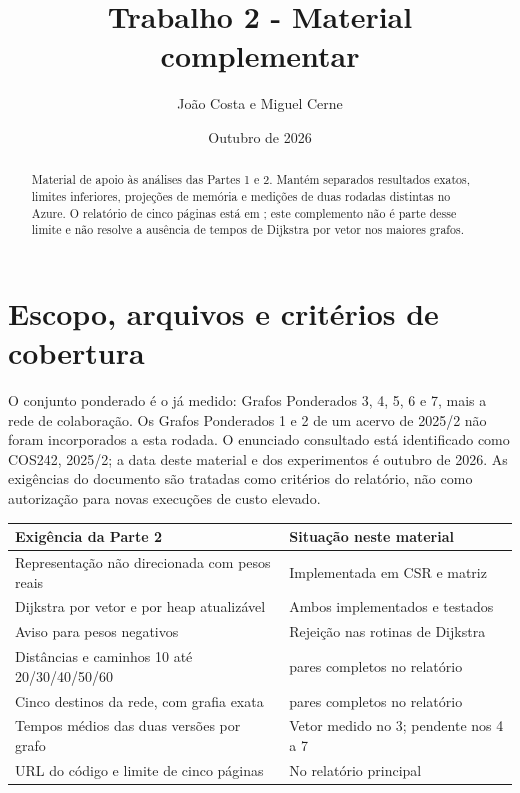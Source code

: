 \documentclass[a4paper,12pt]{article}
\title{Trabalho 2 - Material complementar}
\author{João Costa e Miguel Cerne}
\date{Outubro de 2026}
\begin{document}
\maketitle
\begin{abstract}
Material de apoio às análises das Partes 1 e 2. Mantém separados resultados exatos, limites inferiores, projeções de memória e medições de duas rodadas distintas no Azure. O relatório de cinco páginas está em ; este complemento não é parte desse limite e não resolve a ausência de tempos de Dijkstra por vetor nos maiores grafos.
\end{abstract}
\setcounter{tocdepth}{1}\tableofcontents
\clearpage
\section{Escopo, arquivos e critérios de cobertura}
O conjunto ponderado é o já medido: Grafos Ponderados 3, 4, 5, 6 e 7, mais a rede de colaboração. Os Grafos Ponderados 1 e 2 de um acervo de 2025/2 não foram incorporados a esta rodada. O enunciado consultado está identificado como COS242, 2025/2; a data deste material e dos experimentos é outubro de 2026. As exigências do documento são tratadas como critérios do relatório, não como autorização para novas execuções de custo elevado.
\par\smallskip\noindent\begin{minipage}{\textwidth}\centering
\begingroup\small
\setlength{\tabcolsep}{4pt}
\begin{tabular}{>{\raggedright\arraybackslash}p{8.3cm}>{\raggedright\arraybackslash}p{7cm}}
\toprule
Exigência da Parte 2 & Situação neste material \\
\midrule
Representação não direcionada com pesos reais & Implementada em CSR e matriz \\
Dijkstra por vetor e por heap atualizável & Ambos implementados e testados \\
Aviso para pesos negativos & Rejeição nas rotinas de Dijkstra \\
Distâncias e caminhos 10 até 20/30/40/50/60 & 25 pares completos no relatório \\
Cinco destinos da rede, com grafia exata & 5 pares completos no relatório \\
Tempos médios das duas versões por grafo & Vetor medido no 3; pendente nos 4 a 7 \\
URL do código e limite de cinco páginas & No relatório principal \\
\bottomrule
\end{tabular}
\endgroup
\end{minipage}\par\smallskip
\end{document}
